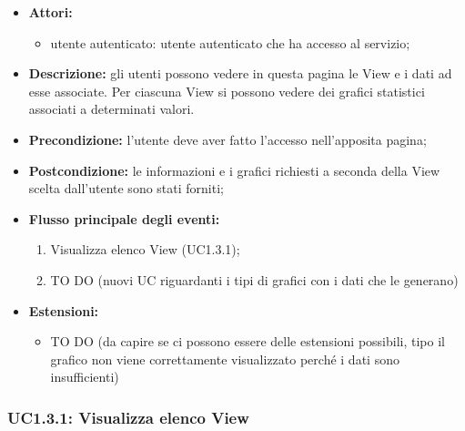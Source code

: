 \begin{itemize}
	\item \textbf{Attori:}
	\begin{itemize}
		\item utente autenticato: utente autenticato che ha accesso al servizio;
	\end{itemize}
	\item \textbf{Descrizione:} gli utenti possono vedere in questa pagina le View e i dati ad esse associate. Per ciascuna View si possono vedere dei grafici statistici associati a determinati valori.
	\item \textbf{Precondizione:} l'utente deve aver fatto l'accesso nell'apposita pagina;
	\item \textbf{Postcondizione:} le informazioni e i grafici richiesti a seconda della View scelta dall'utente sono stati forniti;
	\item \textbf{Flusso principale degli eventi:}
	\begin{enumerate}
		\item Visualizza elenco View (UC1.3.1);
		\item TO DO (nuovi UC riguardanti i tipi di grafici con i dati che le generano)
	\end{enumerate}
	\item \textbf{Estensioni:}
	\begin{itemize}
		\item TO DO (da capire se ci possono essere delle estensioni possibili, tipo il grafico non viene correttamente visualizzato perché i dati sono insufficienti)
	\end{itemize}
\end{itemize}

\subsubsection{UC1.3.1: Visualizza elenco View}

